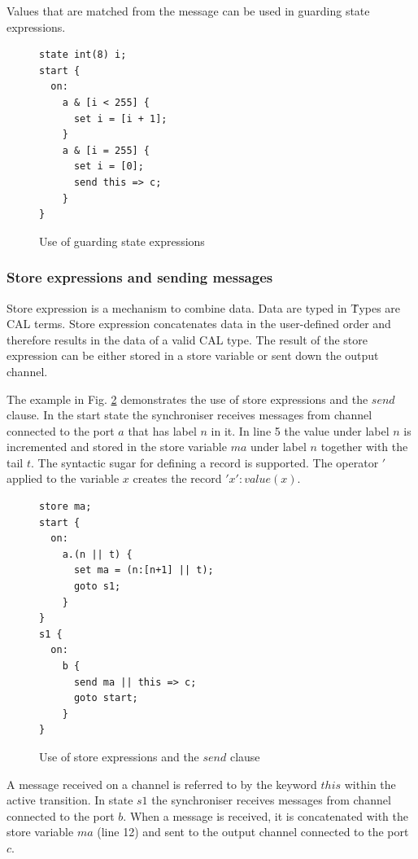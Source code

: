 Values that are matched from the message can be used in guarding state expressions.
\begin{figure}[h!]
\lstset{numbers=left, numberstyle=\small, stepnumber=1, numbersep=8pt}
\begin{lstlisting}[frame=single]
state int(8) i;
start {
  on:
    a & [i < 255] {
      set i = [i + 1];
    }
    a & [i = 255] {
      set i = [0];
      send this => c;
    }
}
\end{lstlisting}
\caption{Use of guarding state expressions}
\label{sync_g_state_exp}
\end{figure}


  \subsubsection{Store expressions and sending messages}
Store expression is a mechanism to combine data. Data are typed in \ak\. Types are CAL terms. Store expression concatenates data in the user-defined order and therefore results in the data of a valid CAL type. The result of the store expression can be either stored in a store variable or sent down the output channel.

The example in Fig. \ref{sync_send} demonstrates the use of store expressions and the $send$ clause. In the start state the synchroniser receives messages from channel connected to the port $a$ that has label $n$ in it. In line 5 the value under label $n$ is incremented and stored in the store variable $ma$ under label $n$ together with the tail $t$. The syntactic sugar for defining a record is supported. The operator $'$ applied to the variable $x$ creates the record $'x': value(x)$.

\begin{figure}[h!]
\lstset{numbers=left, numberstyle=\small, stepnumber=1, numbersep=8pt}
\begin{lstlisting}[frame=single]
store ma;
start {
  on:
    a.(n || t) {
      set ma = (n:[n+1] || t);
      goto s1;
    }
}
s1 {
  on:
    b {
      send ma || this => c;
      goto start;
    }
}
\end{lstlisting}
\caption{Use of store expressions and the $send$ clause}
\label{sync_send}
\end{figure}

A message received on a channel is referred to by the keyword $this$ within the active transition. In state $s1$ the synchroniser receives messages from channel connected to the port $b$. When a message is received, it is concatenated with the store variable $ma$ (line 12) and sent to the output channel connected to the port $c$.




